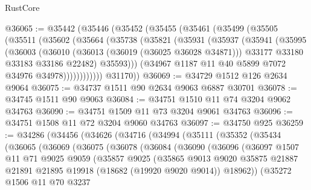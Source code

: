 \begin{lexlean}{RustCore}
\begin{coremodule}
@36065 := @35442
    (@35446
      (@35452
        (@35455
          (@35461
            (@35499
              (@35505
                (@35511
                  (@35602
                    (@35664
                      (@35738
                        (@35821
                          (@35931
                            (@35937
                              (@35941
                                (@35995
                                  (@36003
                                    (@36010
                                      (@36013 (@36019 (@36025 @36028 @34871)))
                                      @33177
                                      @33180
                                      @33183
                                      @33186
                                      @22482)
                                    @35593)))
                              (@34967 @1187 @11 @40 @5899 @7072 @34976 @34978))))))))))))
        @31170))
@36069 := @34729 @1512 @126 @2634 @9064
@36075 := @34737 @1511 @90 @2634 @9063 @6887 @30701
@36078 := @34745 @1511 @90 @9063
@36084 := @34751 @1510 @11 @74 @3204 @9062 @34763
@36090 := @34751 @1509 @11 @73 @3204 @9061 @34763
@36096 := @34751 @1508 @11 @72 @3204 @9060 @34763
@36097 := @34750 @925
@36259 := @34286
    (@34456
      (@34626
        (@34716
          (@34994
            (@35111
              (@35352
                (@35434
                  (@36065
                    (@36069
                      (@36075
                        (@36078
                          (@36084
                            (@36090
                              (@36096
                                (@36097
                                  @1507
                                  @11
                                  @71
                                  @9025
                                  @9059
                                  (@35857
                                    @9025
                                    (@35865
                                      @9013
                                      @9020
                                      @35875
                                      @21887
                                      @21891
                                      @21895
                                      @19918
                                      (@18682 (@19920 @9020 @9014))
                                      @18962))
                                  (@35272
                                    @1506
                                    @11
                                    @70
                                    @3237

\end{coremodule}
\end{lexlean}
